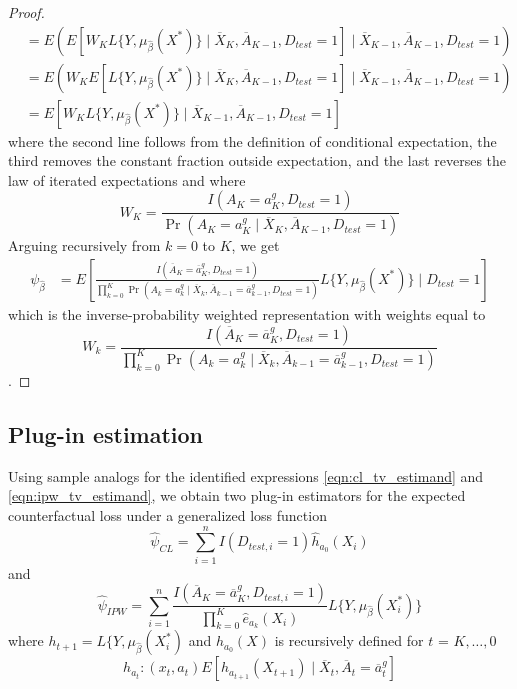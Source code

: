 \begin{proof}
\begin{align*}
        &= E\left(E\left[W_K L\{Y, \mu_{\widehat{\beta}}(X^*)\} \mid \overline{X}_K, \overline{A}_{K-1}, D_{test} = 1\right] \mid \overline{X}_{K-1}, \overline{A}_{K-1}, D_{test} = 1\right)\\
        &= E\left(W_K E\left[L\{Y, \mu_{\widehat{\beta}}(X^*)\} \mid \overline{X}_K, \overline{A}_{K-1}, D_{test} = 1\right] \mid \overline{X}_{K-1}, \overline{A}_{K-1}, D_{test} = 1\right)\\
        &= E\left[W_K L\{Y, \mu_{\widehat{\beta}}(X^*)\} \mid \overline{X}_{K-1}, \overline{A}_{K-1}, D_{test} = 1\right]
    \end{align*}
    where the second line follows from the definition of conditional expectation, the third removes the constant fraction outside expectation, and the last reverses the law of iterated expectations and where 
    $$W_K = \frac{I(A_K = a_K^g, D_{test} = 1)}{\Pr(A_K = a_K^g \mid \overline{X}_K, \overline{A}_{K-1}, D_{test} = 1)}$$
    Arguing recursively from $k = 0$ to $K$, we get
    \begin{align*}
        \psi_{\widehat{\beta}} &= E\left[\frac{I(\overline{A}_K = \overline{a}^g_K, D_{test} = 1)}{\prod_{k=0}^K\Pr(A_k = a^g_k \mid \overline{X}_k, \overline{A}_{k-1} = \overline{a}^g_{k-1}, D_{test} = 1)}L\{Y, \mu_{\widehat{\beta}}(X^*)\} \mid D_{test} = 1\right] 
    \end{align*}
    which is the inverse-probability weighted representation with weights equal to 
    $$W_k = \frac{I(\overline{A}_K = \overline{a}^g_K, D_{test} = 1)}{\prod_{k=0}^K\Pr(A_k = a^g_k \mid \overline{X}_k, \overline{A}_{k-1} = \overline{a}^g_{k-1}, D_{test} = 1)}$$
    .
\end{proof}

\subsection{Plug-in estimation}
Using sample analogs for the identified expressions \ref{eqn:cl_tv_estimand} and \ref{eqn:ipw_tv_estimand}, we obtain two plug-in estimators for the expected counterfactual loss under a generalized loss function
\begin{equation*}
    \widehat{\psi}_{CL} = \sum_{i=1}^nI(D_{test, i} = 1)\widehat{h}_{a_0}(X_i)
\end{equation*}
and 
\begin{equation*}
    \widehat{\psi}_{IPW} = \sum_{i=1}^n \frac{I(\overline{A}_K = \overline{a}^g_K, D_{test,i} = 1)}{\prod_{k=0}^K \widehat{e}_{a_k}(X_i)} L\{Y, \mu_{\widehat{\beta}}(X^*_i)\}
\end{equation*}
where $h_{t+1} = L\{Y, \mu_{\widehat{\beta}}(X^*_i)$ and $h_{a_0}(X)$ is recursively defined for $t$ = $K, \ldots, 0$
\[h_{a_t} : (x_t, a_t) E[ h_{a_{t+1}}(X_{t+1}) \mid \overline{X}_t, \overline{A}_t = \overline{a}^g_t]\]

